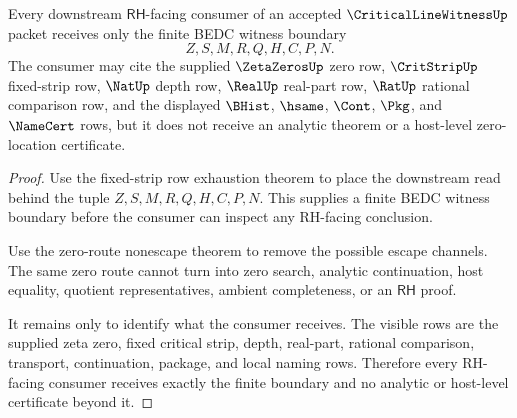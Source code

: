 \begin{theorem}
\label{thm:critical-line-witness-rh-consumer-boundary}
Every downstream $\mathsf{RH}$-facing consumer of an accepted $\CriticalLineWitnessUp$ packet receives only the finite BEDC witness boundary
$$
Z,S,M,R,Q,H,C,P,N.
$$
The consumer may cite the supplied $\ZetaZerosUp$ zero row, $\CritStripUp$ fixed-strip row, $\NatUp$ depth row, $\RealUp$ real-part row, $\RatUp$ rational comparison row, and the displayed $\BHist$, $\hsame$, $\Cont$, $\Pkg$, and $\NameCert$ rows, but it does not receive an analytic theorem or a host-level zero-location certificate.
\end{theorem}
\begin{proof}
Use the fixed-strip row exhaustion theorem to place the downstream read behind the tuple $Z,S,M,R,Q,H,C,P,N$. This supplies a finite BEDC witness boundary before the consumer can inspect any RH-facing conclusion.

Use the zero-route nonescape theorem to remove the possible escape channels. The same zero route cannot turn into zero search, analytic continuation, host equality, quotient representatives, ambient completeness, or an $\mathsf{RH}$ proof.

It remains only to identify what the consumer receives. The visible rows are the supplied zeta zero, fixed critical strip, depth, real-part, rational comparison, transport, continuation, package, and local naming rows. Therefore every RH-facing consumer receives exactly the finite boundary and no analytic or host-level certificate beyond it.
\end{proof}
